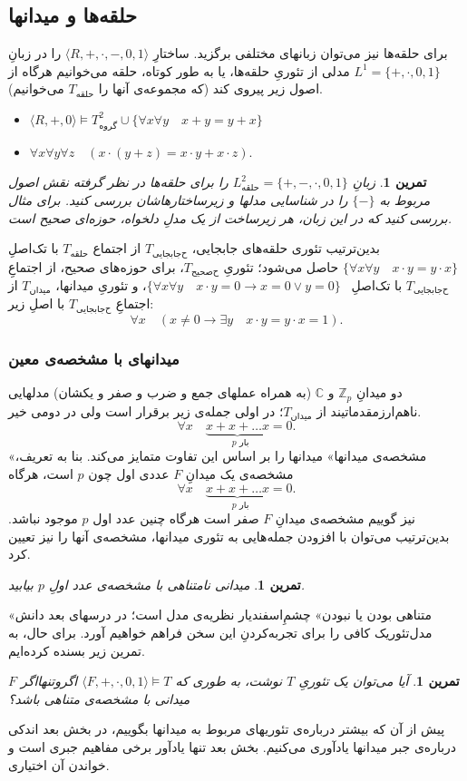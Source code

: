 \documentclass[12pt,a4paper]{report}
\theoremstyle{colorhead}
\newtheorem{tam}[thm]{تمرین}
\begin{document}
\subsection{حلقه‌ها و میدانها}
برای حلقه‌ها نیز می‌توان زبانهای مختلفی برگزید. 
ساختارِ
$\langle R,+,\cdot,-,0,1\rangle$
را
در زبانِ
\mbox{$L^1_{\text{}}=\{+,\cdot,0,1\}$}
مدلی از تئوریِ حلقه‌ها،‌ یا به طور کوتاه،
حلقه‌ 
می‌خوانیم هرگاه از اصول زیر پیروی کند (که مجموعه‌ی آنها را 
$T_{\text{حلقه}}$
می‌خوانیم).
\begin{itemize}
\item 
$\langle R,+,0\rangle \models T^2_{\text{گروه}}\cup \{\forall x\forall y \quad x+y=y+x\}$
\item 
$\forall x\forall y\forall z\quad \left(x\cdot(y+z)=x\cdot y+x\cdot z\right)$.
\end{itemize}
\begin{tam}
زبانِ
$L^2_{\text{حلقه}}=\{+,-,\cdot,0,1\}$
را برای حلقه‌ها در نظر گرفته نقش اصول مربوط به
$\{-\}$
را در شناسایی مدلها و زیرساختارهاشان بررسی کنید. برای مثال بررسی کنید که در این زبان، هر زیرساخت از یک مدلِ دلخواه، حوزه‌ای صحیح است.
\end{tam}
بدین‌ترتیب تئوری حلقه‌های جابجایی،
$T_{\text{ح‌جابجایی}}$
 از اجتماع
$T_{\text{حلقه}}$
با
تک‌اصلِ
\mbox{$\{\forall x\forall y\quad x\cdot y=y\cdot x\}$}
حاصل می‌شود؛ تئوریِ
$T_{\text{ح‌صحیح}}$،
برای حوزه‌های صحیح، از اجتماعِ
$T_{\text{ح‌جابجایی}}$
با تک‌اصلِ
\mbox{
$\{\forall x\forall y\quad x\cdot y=0\to x=0\vee y=0\}$}،
و تئوریِ میدانها،
$T_{\text{میدان}}$
از اجتماعِ
$T_{\text{ح‌جابجایی}}$
با اصلِ
زیر:
\[
\forall x \quad (x\not=0\to \exists y\quad x\cdot y=y\cdot x=1).
\]
\subsubsection{میدانهای با مشخصه‌ی معین}
دو میدانِ
$\mathbb{Z}_p$
و
$\mathbb{C}$
(به همراه عملهای جمع  و ضرب و صفر و  یکشان)  مدلهایی 
ناهم‌ارز‌مقدماتیند
از
$T_{\text{میدان}}$؛
در اولی جمله‌ی زیر برقرار است ولی در دومی خیر.
\[
\forall x\quad \underbrace{x+x+\ldots x}_{\text{ $p$ بار}}=0.
\]
«مشخصه‌ی میدانها» میدانها را بر اساس این تفاوت متمایز می‌کند.
بنا به تعریف، مشخصه‌ی یک میدانِ
$F$
عددی اول چون 
$p$
است، هرگاه
\[
\forall x\quad \underbrace{x+x+\ldots x}_{\text{ $p$ بار}}=0.
\]
نیز گوییم مشخصه‌ی میدانِ
$F$
صفر است هرگاه چنین عدد اول
$p$
موجود نباشد. بدین‌ترتیب می‌توان با افزودن جمله‌هایی به تئوری‌ میدانها، مشخصه‌ی آنها را نیز تعیین کرد.
\begin{tam}
میدانی نامتناهی با مشخصه‌ی عدد اولِ
$p$
بیابید.
\end{tam}
«متناهی بودن یا نبودن» چشم‌ِاسفندیار نظریه‌ی مدل است؛ در درسهای بعد دانش مدل‌تئوریک کافی را
برای تجربه‌کردنِ این سخن فراهم خواهیم آورد. 
برای حال، به تمرین زیر بسنده کرده‌ایم.
\begin{tam}
آیا می‌توان یک تئوریِ
$T$
نوشت، به طوری که
$\langle F,+,\cdot,0,1\rangle\models T$
اگروتنهااگر
$F$
میدانی با مشخصه‌ی متناهی باشد؟
\end{tam}
پیش از آن که بیشتر درباره‌ی تئوریهای مربوط به میدانها بگوییم، در بخش بعد اندکی درباره‌ی جبر میدانها یادآوری می‌کنیم. بخش بعد تنها یادآور برخی مفاهیم جبری است و خواندن آن اختیاری. 
\end{document}
